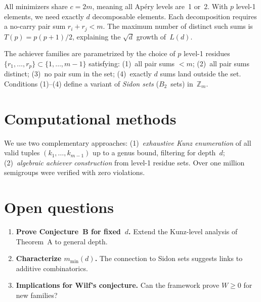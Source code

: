 \documentclass[11pt,a4paper]{amsart}
\theoremstyle{definition}
\theoremstyle{remark}
\begin{document}
All minimizers share $c = 2m$, meaning all Ap\'ery levels are~1 or~2.
With $p$ level-1 elements, we need exactly $d$ decomposable elements.
Each decomposition requires a no-carry pair sum $r_i + r_j < m$.
The maximum number of distinct such sums is
$T(p) = p(p+1)/2$, explaining the $\sqrt{d}$ growth of~$L(d)$.

The achiever families are parametrized by the choice of $p$ level-1
residues $\{r_1, \dots, r_p\} \subset \{1, \dots, m{-}1\}$ satisfying:
(1)~all pair sums $< m$;
(2)~all pair sums distinct;
(3)~no pair sum in the set;
(4)~exactly $d$ sums land outside the set.
Conditions (1)--(4) define a variant of \emph{Sidon sets} ($B_2$~sets)
in~$\mathbb{Z}_m$.

\section{Computational methods}\label{sec:comp}

We use two complementary approaches:
(1)~\emph{exhaustive Kunz enumeration} of all valid tuples
$(k_1,\dots,k_{m-1})$ up to a genus bound, filtering for depth~$d$;
(2)~\emph{algebraic achiever construction} from level-1 residue sets.
Over one million semigroups were verified with zero violations.

\section{Open questions}\label{sec:open}

\begin{enumerate}
\item \textbf{Prove Conjecture~B for fixed~$d$.}
  Extend the Kunz-level analysis of Theorem~A to general depth.
\item \textbf{Characterize $m_{\min}(d)$.}
  The connection to Sidon sets suggests links to additive combinatorics.
\item \textbf{Implications for Wilf's conjecture.}
  Can the framework prove $W \ge 0$ for new families?
\end{enumerate}
\end{document}
